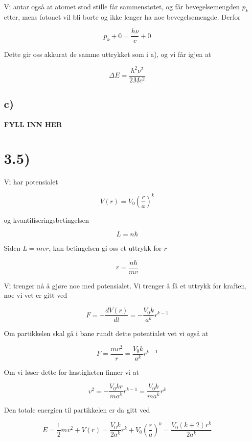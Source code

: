 \documentclass[a4paper,norsk, 10pt]{article}
\begin{document}
Vi antar også at atomet stod stille får sammenstøtet, og får bevegelsemengden $p_k$ etter, mens fotonet vil bli borte og ikke lenger ha noe bevegelsemengde. Derfor

$$
p_k + 0 = \frac{h\nu}{c} + 0
$$

Dette gir oss akkurat de samme uttrykket som i a), og vi får igjen at

$$
\Delta E = \frac{h^2\nu^2}{2Mc^2}
$$

\subsection*{c)}

\textbf{FYLL INN HER}

\section*{3.5)}

Vi har potensialet 

\begin{equation}
V(r) = V_0\left(\frac{r}{a}\right)^k
\label{eq:pot}
\end{equation}

og kvantifiseringsbetingelsen

$$
L = n\hbar
$$

Siden $L = mvr$, kan betingelsen gi oss et uttrykk for $r$

\begin{equation}
r = \frac{n\hbar}{mv}
\label{eq:r}
\end{equation}

Vi trenger nå å gjøre noe med potensialet. Vi trenger å få et uttrykk for kraften, noe vi vet er gitt ved

$$
F = -\frac{dV(r)}{dt} = -\frac{V_0k}{a^k}r^{k-1}
$$

Om partikkelen skal gå i bane rundt dette potentialet vet vi også at

$$
F = \frac{mv^2}{r} = \frac{V_0k}{a^k}r^{k-1}
$$

Om vi løser dette for hastigheten finner vi at 

\begin{equation}
v^2 = -\frac{V_0kr}{ma^k}r^{k-1} = \frac{V_0k}{ma^k}r^{k}
\label{eq:v2}
\end{equation}

Den totale energien til partikkelen er da gitt ved

\begin{equation}
E = \frac{1}{2}mv^2 + V(r) = \frac{V_0k}{2a^k}r^{k} + V_0\left(\frac{r}{a}\right)^k = \frac{V_0(k+2)r^k}{2a^k}
\label{eq:E}
\end{equation}
\end{document}
